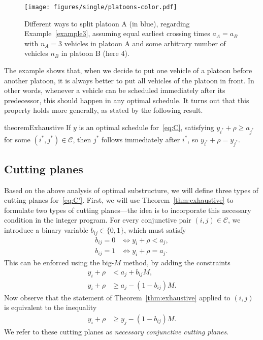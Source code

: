 \documentclass[a4paper]{report}
\theoremstyle{definition}
\theoremstyle{plain}
\begin{document}
\begin{figure}
  \centering
  \texttt{[image: figures/single/platoons-color.pdf]}
  \caption{Different ways to split platoon A (in blue), regarding Example~\ref{example3},
    assuming equal earliest crossing times $a_{A} = a_{B}$ with $n_{A} = 3$
    vehicles in platoon A and some arbitrary number of vehicles $n_{B}$ in
    platoon B (here 4).}
  \label{fig:example3}
\end{figure}

The example shows that, when we decide to put one vehicle of a platoon before
another platoon, it is always better to put all vehicles of the platoon in
front. In other words, whenever a vehicle can be scheduled immediately after its
predecessor, this should happen in any optimal schedule. It turns out that this
property holds more generally, as stated by the following result.

\begin{restatable}{theorem}{Exhaustive}\label{thm:exhaustive}
  If $y$ is an optimal schedule for~\eqref{eq:C},
  satisfying $y_{i^{*}} + \rho \geq a_{j^{*}}$ for some $(i^{*},j^{*}) \in \mathcal{C}$, then $j^{*}$
  follows immediately after $i^{*}$, so $y_{i^{*}} + \rho = y_{j^{*}}$.
\end{restatable}

\pagebreak[4]
\subsection{Cutting planes}
Based on the above analysis of optimal substructure, we will define three types
of cutting planes for~\eqref{eq:C'}.
%
First, we will use Theorem~\ref{thm:exhaustive} to formulate two types of cutting planes---the
idea is to incorporate this necessary condition in the integer program.
%
For every conjunctive pair $(i,j) \in \mathcal{C}$, we introduce a binary
variable $b_{ij} \in \{0, 1\}$, which must satisfy
\begin{align*}
  b_{ij} = 0 &\iff y_{i} + \rho < a_{j} , \\
  b_{ij} = 1 &\iff y_{i} + \rho = a_{j} .
\end{align*}
This can be enforced using the big-$M$ method, by adding the constraints
\begin{align*}
  y_{i} + \rho &< a_{j} + b_{ij}M ,  \\
  y_{i} + \rho &\geq a_{j} - (1 - b_{ij}) M .
\end{align*}
Now observe that the statement of Theorem~\ref{thm:exhaustive} applied to $(i,j)$ is equivalent
to the inequality
\begin{align}
  y_{i} + \rho &\geq y_{j} - (1 - b_{ij}) M \tag{conj.cut} .
\end{align}
We refer to these cutting planes as \textit{necessary conjunctive cutting planes}.
\end{document}
